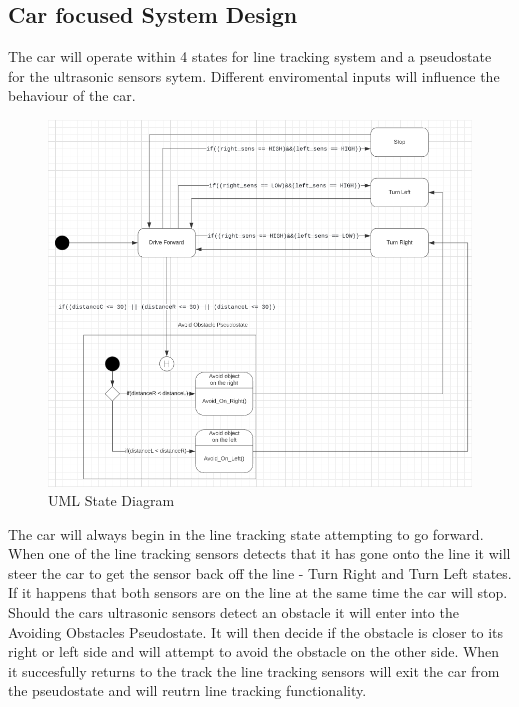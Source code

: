 \documentclass[conference]{IEEEtran}
\begin{document}
\subsection{Car focused System Design}
The car will operate within 4 states for line tracking system and a pseudostate for the ultrasonic sensors sytem. Different enviromental inputs will influence the behaviour of the car.
\begin{figure}[h!]
	\includegraphics[width=\linewidth]{UMLStateDiagram.png}
	\caption{UML State Diagram}
	\label{fig:UMLSD1}
\end{figure}
The car will always begin in the line tracking state attempting to go forward. When one of the line tracking sensors detects that it has gone onto the line it will steer the car to get the sensor back off the line - Turn Right and Turn Left states. If it happens that both sensors are on the line at the same time the car will stop. Should the cars ultrasonic sensors detect an obstacle it will enter into the Avoiding Obstacles Pseudostate. It will then decide if the obstacle is closer to its right or left side and will attempt to avoid the obstacle on the other side. When it succesfully returns to the track the line tracking sensors will exit the car from the pseudostate and will reutrn line tracking functionality.
\end{document}
